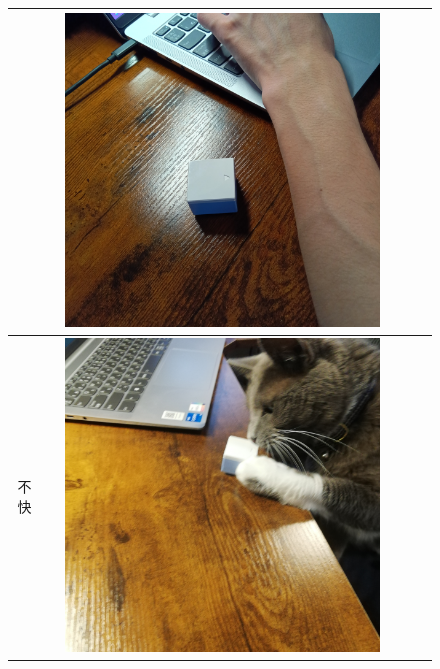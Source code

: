 \documentclass[paper=a4paper,jafontsize=9pt,head_space=15mm,gutter=20mm,
twocolumn,number_of_lines=49, line_length=26zw]{myuarticle}
\begin{document}
\begin{figure}[t]
\begin{tabular}{|c|c|c|c|}
\begin{minipage}[c]{0.15\textwidth}
    \end{minipage}    &
    \begin{minipage}[c]{0.15\textwidth}
      \centering
      \includegraphics[width=0.9\textwidth]{resources/pet_before.jpg}
    \end{minipage}
    \\ \hline
    不快 &
    \begin{minipage}[c]{0.15\textwidth}
      \centering
      \includegraphics[width=0.9\textwidth]{resources/cat_after.jpg}

\end{minipage}
\end{tabular}
\end{figure}
\end{document}
